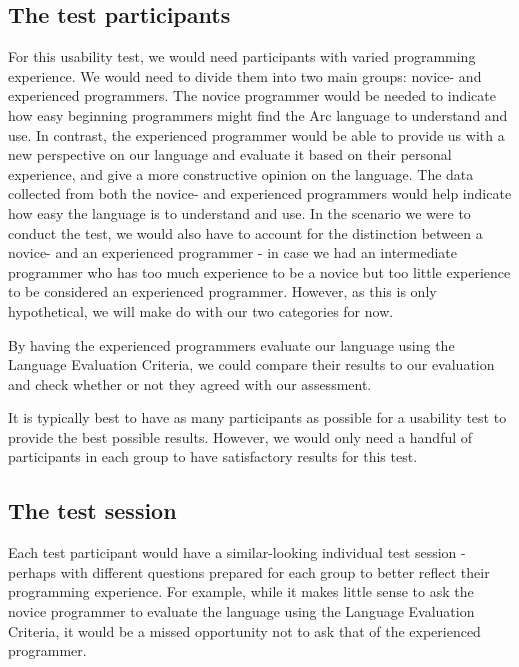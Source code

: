 \subsection{The test participants}\label{subsubsec:theTestParticipants}

For this usability test, we would need participants with varied programming experience. We would need to divide them into two main groups: novice- and experienced programmers. The novice programmer would be needed to indicate how easy beginning programmers might find the Arc language to understand and use. In contrast, the experienced programmer would be able to provide us with a new perspective on our language and evaluate it based on their personal experience, and give a more constructive opinion on the language. The data collected from both the novice- and experienced programmers would help indicate how easy the language is to understand and use. In the scenario we were to conduct the test, we would also have to account for the distinction between a novice- and an experienced programmer - in case we had an intermediate programmer who has too much experience to be a novice but too little experience to be considered an experienced programmer. However, as this is only hypothetical, we will make do with our two categories for now.

By having the experienced programmers evaluate our language using the Language Evaluation Criteria, we could compare their results to our evaluation and check whether or not they agreed with our assessment.

It is typically best to have as many participants as possible for a usability test to provide the best possible results. However, we would only need a handful of participants in each group to have satisfactory results for this test.

\subsection{The test session}\label{subsubsec:theTestSession}

Each test participant would have a similar-looking individual test session - perhaps with different questions prepared for each group to better reflect their programming experience. For example, while it makes little sense to ask the novice programmer to evaluate the language using the Language Evaluation Criteria, it would be a missed opportunity not to ask that of the experienced programmer.

